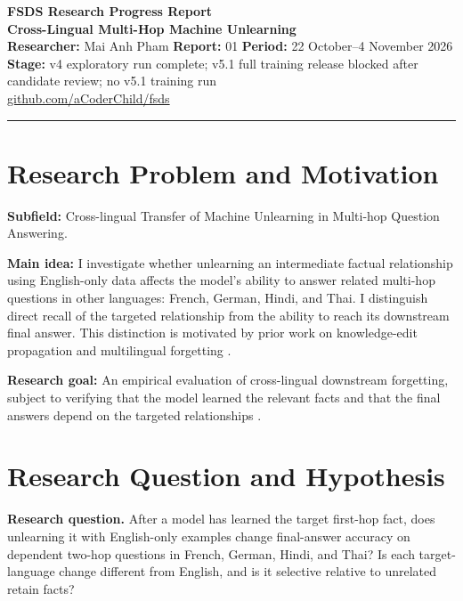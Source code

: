 \documentclass[10pt,a4paper]{article}
\begin{document}
\begin{center}
{\LARGE\color{fsds}\bfseries FSDS Research Progress Report}\\[5pt]
{\Large\bfseries Cross-Lingual Multi-Hop Machine Unlearning}\\[7pt]
{\small\textbf{Researcher:} Mai Anh Pham \quad\textbar\quad \textbf{Report:} 01 \quad\textbar\quad \textbf{Period:} 22 October--4 November 2026}\\[3pt]
{\small\textbf{Stage:} v4 exploratory run complete; v5.1 full training release blocked after candidate review; no v5.1 training run}\\[4pt]
{\small\href{https://github.com/aCoderChild/fsds}{github.com/aCoderChild/fsds}}
\end{center}
\vspace{2pt}\hrule\vspace{5pt}

\section{Research Problem and Motivation}

\textbf{Subfield:} Cross-lingual Transfer of Machine Unlearning in Multi-hop Question Answering.

\textbf{Main idea:} I investigate whether unlearning an intermediate factual relationship using English-only data affects the model's ability to answer related multi-hop questions in other languages: French, German, Hindi, and Thai. I distinguish direct recall of the targeted relationship from the ability to reach its downstream final answer. This distinction is motivated by prior work on knowledge-edit propagation and multilingual forgetting \cite{zhong2023mquake,xiang2026multilingual}.

\textbf{Research goal:} An empirical evaluation of cross-lingual downstream forgetting, subject to verifying that the model learned the relevant facts and that the final answers depend on the targeted relationships \cite{waseem2026falsepositive,yang2025socrates}.

\section{Research Question and Hypothesis}

\textbf{Research question.} After a model has learned the target first-hop fact, does unlearning it with English-only examples change final-answer accuracy on dependent two-hop questions in French, German, Hindi, and Thai? Is each target-language change different from English, and is it selective relative to unrelated retain facts?
\end{document}
